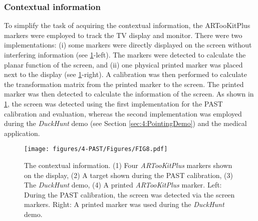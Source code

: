 \subsubsection{Contextual information} {\label{sec:4:markerDetection}}
To simplify the task of acquiring the contextual information, the ARTooKitPlus \citep{Wagner2007a} markers were employed to track the TV display and monitor. There were two implementations: (i) some markers were directly displayed on the screen without interfering information (see \figurename{ \ref{fig:MarkerTracking}-left}). The markers were detected to calculate the planar function of the screen, and (ii) one physical printed marker was placed next to the display (see \figurename{ \ref{fig:MarkerTracking}-right}). A calibration was then performed to calculate the transformation matrix from the printed marker to the screen. The printed marker was then detected to calculate the information of the screen. 
As shown in \figurename{ \ref{fig:MarkerTracking}}, the screen was detected using the first implementation for the PAST calibration and evaluation, whereas the second implementation was employed during the \textit{DuckHunt} demo (see Section \ref{sec:4:PointingDemo}) and the medical application.
\begin{figure}
	\centering
	\texttt{[image: figures/4-PAST/Figures/FIG8.pdf]}
	\caption{The contextual information. (1) Four \textit{ARTooKitPlus} markers shown on the display, (2) A target shown during the PAST calibration, (3) The \textit{DuckHunt} demo, (4) A printed \textit{ARTooKitPlus} marker. Left: During the PAST calibration, the screen was detected via the screen markers. Right: A printed marker was used during the \textit{DuckHunt} demo.}
	\label{fig:MarkerTracking}
\end{figure}
